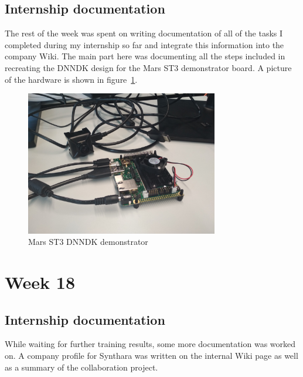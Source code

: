 \subsection{Internship documentation}
The rest of the week was spent on writing documentation of all of the tasks I completed during my internship so far and integrate this information into the company Wiki. The main part here was documenting all the steps included in recreating the \ac{DNNDK} design for the Mars ST3 demonstrator board. A picture of the hardware is shown in figure~\ref{fig:st3_demonstrator}.
\begin{figure}[!htb]
	\centering
		\includegraphics[width=0.75\textwidth]{bilder/ST3_demonstrator.jpg}
		\caption{Mars ST3 \ac{DNNDK} demonstrator}
		\label{fig:st3_demonstrator}
\end{figure}

\section{Week 18}
\subsection{Internship documentation}
While waiting for further training results, some more documentation was worked on. A company profile for Synthara was written on the internal Wiki page as well as a summary of the collaboration project.
